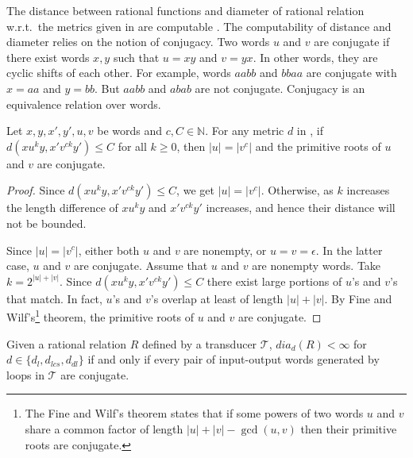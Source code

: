 \documentclass[a4paper,UKenglish,cleveref, autoref, thm-restate,authorcolumns, colorlinks]{lipics-v2021}
\newcommand\calT{\mathcal{T}}
\newcommand\dia[2]{\ensuremath{\mathit{dia}_{#2}(#1)}}
\newcommand{\dlev}{\ensuremath{d_l}}
\begin{document}
The distance between rational functions and diameter of rational relation w.r.t.~the metrics given in  are computable \cite{editdistance}. The computability of distance and diameter relies on the notion of conjugacy.  Two words $u$ and $v$ are conjugate if there exist words $x,y$ such that $u=xy$ and $v =yx$. In other words, they are cyclic shifts of each other. For example, words $aabb$ and $bbaa$ are conjugate with $x=aa$ and $y=bb$. But $aabb$ and $abab$ are not conjugate. Conjugacy is an equivalence relation over words.

\begin{proposition}\label{prop:conj}
    Let $x,y,x',y',u,v$ be words and $c,C \in \mathbb{N}$. For any metric $d$ in , if $d(xu^ky,x'v^{ck}y') \leq C$ for all $k \geq 0$, then $|u| = |v^{c}|$ and the primitive roots of $u$ and $v$ are conjugate. 
\end{proposition}

\begin{proof}
    Since $d(xu^ky,x'v^{ck}y') \leq C$, we get $|u| = |v^c|$. Otherwise, as $k$ increases the length difference of $xu^{k}y$ and $x'v^{ck}y'$ increases, and hence their distance will not be bounded.

    Since $|u| = |v^c|$, either both $u$ and $v$ are nonempty, or $u=v= \epsilon$. In the latter case, $u$ and $v$ are conjugate. Assume that $u$ and $v$ are nonempty words. Take $k = 2^{|u| + |v|}$. Since $d(xu^ky,x'v^{ck}y') \leq C$ there exist large portions of $u$’s and $v$’s that match. In fact, $u$'s and $v$'s overlap at least of length $|u| + |v|$. By Fine and Wilf's\footnote{The Fine and Wilf's theorem states that if some powers of two words $u$ and $v$ share a common factor of length $|u| + |v| - \gcd(u,v)$ then their primitive roots are conjugate.} theorem, the primitive roots of $u$ and $v$ are conjugate. 
\end{proof}


\begin{proposition}\label{prop:levboundconj}
    Given a rational relation $R$ defined by a transducer $\calT$, $\dia{R}{d} < \infty$ for $d \in \{\dlev,d_{lcs},d_{dl}\}$ if and only if every pair of input-output words generated by loops in $\calT$ are conjugate.
   
\end{proposition}
\end{document}
